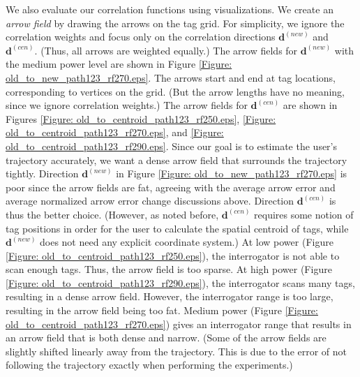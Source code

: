 We also evaluate our correlation functions using visualizations.  We create an \emph{arrow field} by drawing the arrows on the tag grid.  For simplicity, we ignore the correlation weights and focus only on the correlation directions $\mathbf{d}^{\left(new\right)}$ and $\mathbf{d}^{\left(cen\right)}$.  (Thus, all arrows are weighted equally.) The arrow fields for $\mathbf{d}^{\left(new\right)}$ with the medium power level are shown in Figure \ref{Figure: old_to_new_path123_rf270.eps}.  The arrows start and end at tag locations, corresponding to vertices on the grid. (But the arrow lengths have no meaning, since we ignore correlation weights.) The arrow fields for $\mathbf{d}^{\left(cen\right)}$ are shown in Figures \ref{Figure: old_to_centroid_path123_rf250.eps}, \ref{Figure: old_to_centroid_path123_rf270.eps}, and \ref{Figure: old_to_centroid_path123_rf290.eps}.  Since our goal is to estimate the user's trajectory accurately, we want a dense arrow field that surrounds the trajectory tightly.  Direction $\mathbf{d}^{\left(new\right)}$ in Figure \ref{Figure: old_to_new_path123_rf270.eps} is poor since the arrow fields are fat, agreeing with the average arrow error and average normalized arrow error change discussions above.  Direction $\mathbf{d}^{\left(cen\right)}$ is thus the better choice. (However, as noted before, $\mathbf{d}^{\left(cen\right)}$ requires some notion of tag positions in order for the user to calculate the spatial centroid of tags, while $\mathbf{d}^{\left(new\right)}$ does not need any explicit coordinate system.) At low power (Figure \ref{Figure: old_to_centroid_path123_rf250.eps}), the interrogator is not able to scan enough tags.  Thus, the arrow field is too sparse.  At high power (Figure \ref{Figure: old_to_centroid_path123_rf290.eps}), the interrogator scans many tags, resulting in a dense arrow field.  However, the interrogator range is too large, resulting in the arrow field being too fat.  Medium power (Figure \ref{Figure: old_to_centroid_path123_rf270.eps}) gives an interrogator range that results in an arrow field that is both dense and narrow.  (Some of the arrow fields are slightly shifted linearly away from the trajectory.  This is due to the error of not following the trajectory exactly when performing the experiments.) 

